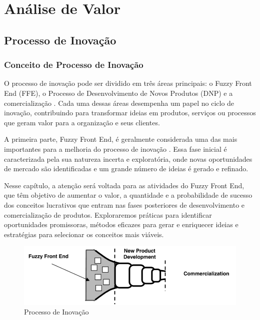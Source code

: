 \chapter{Análise de Valor} 
\label{chap:Chapter03} 

\section{Processo de Inovação}

\subsection{Conceito de Processo de Inovação}

O processo de inovação pode ser dividido em três áreas principais: o Fuzzy Front End (FFE), o Processo de Desenvolvimento de Novos Produtos (DNP) e a comercialização \parencite{BOOK01}. Cada uma dessas áreas desempenha um papel no ciclo de inovação, contribuindo para transformar ideias em produtos, serviços ou processos que geram valor para a organização e seus clientes. 

A primeira parte, Fuzzy Front End, é geralmente considerada uma das mais importantes para a melhoria do processo de inovação \parencite{BOOK01}. Essa fase inicial é caracterizada pela sua natureza incerta e exploratória, onde novas oportunidades de mercado são identificadas e um grande número de ideias é gerado e refinado.

Nesse capítulo, a atenção será voltada para as atividades do Fuzzy Front End, que têm objetivo de aumentar o valor, a quantidade e a probabilidade de sucesso dos conceitos lucrativos que entram nas fases posteriores de desenvolvimento e comercialização de produtos. Exploraremos práticas para identificar oportunidades promissoras, métodos eficazes para gerar e enriquecer ideias e estratégias para selecionar os conceitos mais viáveis.

\begin{figure}[h]
    \centering
    \includegraphics[scale=0.5]{ch03/assets/inovation-process.png}
    \decoRule
    \caption[Processo de Inovação]{Processo de Inovação \parencite{BOOK01}}
    \label{fig:ch02-inovation-process}
\end{figure}

